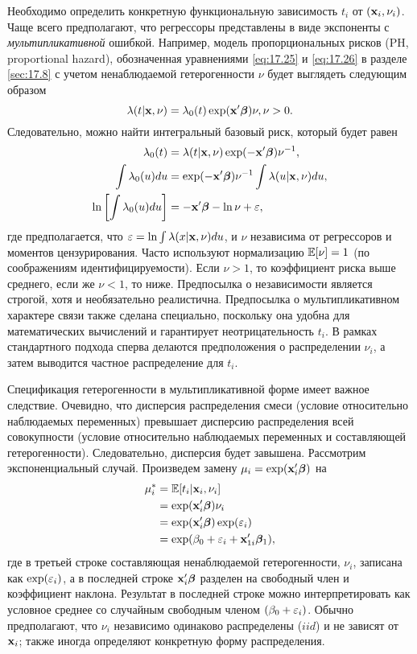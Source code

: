 Необходимо определить конкретную функциональную зависимость $t_i$ от $(\mathbf{x}_i,\nu_i)$. Чаще всего предполагают, что регрессоры представлены в виде экспоненты с \textit{мультипликативной} ошибкой. Например, модель пропорциональных рисков (PH, proportional hazard), обозначенная уравнениями \ref{eq:17.25} 
и \ref{eq:17.26} 
в разделе \ref{sec:17.8} 
с учетом ненаблюдаемой гетерогенности $\nu$ будет выглядеть следующим образом
    $$\lambda(t|\mathbf{x},\nu)=\lambda_0(t)\exp(\mathbf{x}'\bm{\beta})\nu, \nu>0.$$
Следовательно, можно найти интегральный базовый риск, который будет равен
    \begin{align}
    \label{eq:18.1}
    \lambda_0(t)                        &=\lambda(t|\mathbf{x},\nu)\exp(-\mathbf{x}'\bm{\beta})\nu^{-1},\\
    \int\lambda_0(u)du                  &=\exp(-\mathbf{x}'\bm{\beta})\nu^{-1}\int\lambda(u|\mathbf{x},\nu)du, \notag \\
    \ln\left[\int\lambda_0(u)du\right]  &=-\mathbf{x}'\bm{\beta}-\ln\nu+\varepsilon, \notag
    \end{align}
где предполагается, что $\varepsilon=\ln\int\lambda(x|\mathbf{x},\nu)du$, и $\nu$ независима от регрессоров и моментов цензурирования. Часто используют нормализацию $\mathbb{E}[\nu]=1$ (по соображениям идентифицируемости). Если $\nu>1$, то коэффициент риска выше среднего, если же $\nu<1$, то ниже. Предпосылка о независимости является строгой, хотя и необязательно реалистична. Предпосылка о мультипликативном характере связи также сделана специально, поскольку она удобна для математических вычислений и гарантирует неотрицательность $t_i$. В рамках стандартного подхода сперва делаются предположения о распределении $\nu_i$, а затем выводится частное распределение для $t_i$.

Спецификация гетерогенности в мультипликативной форме имеет важное следствие. 
Очевидно, что дисперсия распределения смеси (условие относительно наблюдаемых переменных) превышает дисперсию распределения всей совокупности (условие относительно наблюдаемых переменных и составляющей гетерогенности). Следовательно, дисперсия будет завышена. Рассмотрим экспоненциальный случай. Произведем замену $\mu_i=\exp(\mathbf{x}_i'\bm{\beta})$ на
    \begin{align}
    \label{eq:18.2}
    \mu_i^*&=\mathbb{E}[t_i|\mathbf{x}_i,\nu_i]\\
            &=\exp(\mathbf{x}_i'\bm{\beta})\nu_i \notag \\
            &=\exp(\mathbf{x}_i'\bm{\beta})\exp(\varepsilon_i) \notag \\
            &=\exp(\beta_0+\varepsilon_i+\mathbf{x}_{1i}'\bm{\beta}_1), \notag
    \end{align}
где в третьей строке составляющая ненаблюдаемой гетерогенности, $\nu_i$, записана как $\exp(\varepsilon_i)$, а в последней строке $\mathbf{x}_i'\bm{\beta}$ разделен на свободный член и коэффициент наклона. Результат в последней строке можно интерпретировать как условное среднее со случайным свободным членом $(\beta_0+\varepsilon_i)$. Обычно предполагают, что $\nu_i$ независимо одинаково распределены ($iid$) и не зависят от $\mathbf{x}_i$; также иногда определяют конкретную форму распределения.

